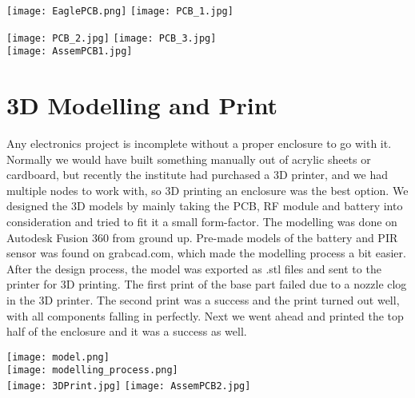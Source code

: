 \begin{center}
	\texttt{[image: EaglePCB.png]}
	\texttt{[image: PCB\_1.jpg]}
	
	\texttt{[image: PCB\_2.jpg]}
	\texttt{[image: PCB\_3.jpg]}
	\\
	\vspace{10pt}
	\texttt{[image: AssemPCB1.jpg]}
\end{center}


\section{3D Modelling and Print}
Any electronics project is incomplete without a proper enclosure to go with it. Normally we would have built something manually out of acrylic sheets or cardboard, but recently the institute had purchased a 3D printer, and we had multiple nodes to work with, so 3D printing an enclosure was the best option. 
We designed the 3D models by mainly taking the PCB, RF module and battery into consideration and tried to fit it a small form-factor. The modelling was done on Autodesk Fusion 360 from ground up. Pre-made models of the battery and PIR sensor was found on grabcad.com, which made the modelling process a bit easier.
After the design process, the model was exported as .stl files and sent to the printer for 3D printing. The first print of the base part failed due to a nozzle clog in the 3D printer. The second print was a success and the print turned out well, with all components falling in perfectly. Next we went ahead and printed the top half of the enclosure and it was a success as well.

\begin{center}
	\texttt{[image: model.png]}
	\\
	\vspace{10pt}
	\texttt{[image: modelling\_process.png]}
	\\
	\vspace{10pt}	
	\texttt{[image: 3DPrint.jpg]}
	\texttt{[image: AssemPCB2.jpg]}
\end{center}

